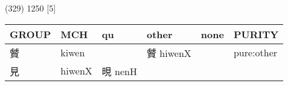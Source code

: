 \documentclass[14pt,a4paper]{scrartcl}
\begin{document}
(329) 1250 {[}5{]}

\begin{longtable}[c]{@{}llllll@{}}
\toprule
\begin{minipage}[b]{0.14\columnwidth}\raggedright\strut
GROUP
\strut\end{minipage} &
\begin{minipage}[b]{0.14\columnwidth}\raggedright\strut
MCH
\strut\end{minipage} &
\begin{minipage}[b]{0.14\columnwidth}\raggedright\strut
qu
\strut\end{minipage} &
\begin{minipage}[b]{0.14\columnwidth}\raggedright\strut
other
\strut\end{minipage} &
\begin{minipage}[b]{0.14\columnwidth}\raggedright\strut
none
\strut\end{minipage} &
\begin{minipage}[b]{0.14\columnwidth}\raggedright\strut
PURITY
\strut\end{minipage}\tabularnewline
\midrule
\endhead
\begin{minipage}[t]{0.14\columnwidth}\raggedright\strut
贙
\strut\end{minipage} &
\begin{minipage}[t]{0.14\columnwidth}\raggedright\strut
kiwen
\strut\end{minipage} &
\begin{minipage}[t]{0.14\columnwidth}\raggedright\strut
\strut\end{minipage} &
\begin{minipage}[t]{0.14\columnwidth}\raggedright\strut
贙 hiwenX
\strut\end{minipage} &
\begin{minipage}[t]{0.14\columnwidth}\raggedright\strut
\strut\end{minipage} &
\begin{minipage}[t]{0.14\columnwidth}\raggedright\strut
pure:other
\strut\end{minipage}\tabularnewline
\begin{minipage}[t]{0.14\columnwidth}\raggedright\strut
見
\strut\end{minipage} &
\begin{minipage}[t]{0.14\columnwidth}\raggedright\strut
hiwenX
\strut\end{minipage} &
\begin{minipage}[t]{0.14\columnwidth}\raggedright\strut
晛 nenH
\strut\end{minipage} &

\end{longtable}
\end{document}
